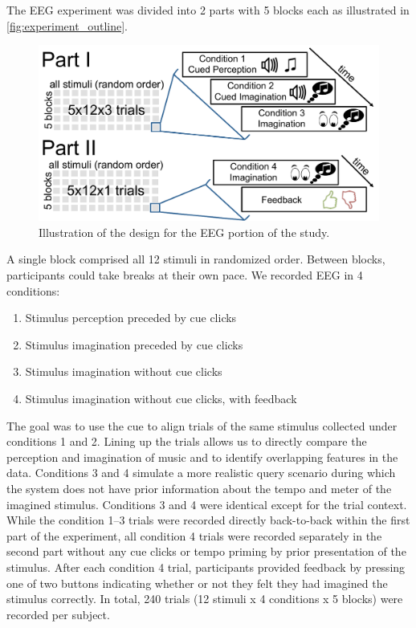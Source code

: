 The EEG experiment was divided into 2 parts with 5 blocks each as illustrated in \autoref{fig:experiment_outline}.
\begin{figure}[htbp]
  \begin{center}
    \includegraphics[scale=0.6]{Figures/study_design_small.pdf}
    \caption{%
Illustration of the design for the EEG portion of the study.
}
    \label{fig:experiment_outline}
  \end{center}
\end{figure}
A single block comprised all 12 stimuli in randomized order.
Between blocks, participants could take breaks at their own pace.
We recorded EEG in 4 conditions:
\begin{enumerate}
\item
Stimulus perception preceded by cue clicks
\item
Stimulus imagination preceded by cue clicks
\item
Stimulus imagination without cue clicks
\item
Stimulus imagination without cue clicks, with feedback
\end{enumerate}

The goal was to use the cue to align trials of the same stimulus collected under conditions 1 and 2. Lining up the trials allows us to directly compare the perception and imagination of music and to identify overlapping features in the data. 
Conditions 3 and 4 simulate a more realistic query scenario during which the system does not have prior information about the tempo and meter of the imagined stimulus.
Conditions 3 and 4 were identical except for the trial context.
While the condition 1--3 trials were recorded directly back-to-back within the first part of the experiment, 
all condition 4 trials were recorded separately in the second part without any cue clicks or tempo priming by prior presentation of the stimulus.
After each condition 4 trial, participants provided feedback by pressing one of two buttons indicating whether or not they felt they had imagined the stimulus correctly.
In total, 240 trials (12 stimuli x 4 conditions x 5 blocks) were recorded per subject.

